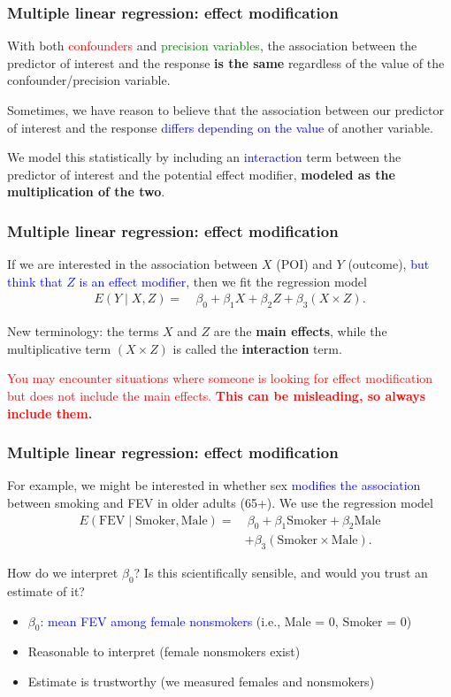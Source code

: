 \documentclass[12pt, 
hyperref={colorlinks=true, linkcolor=blue, urlcolor=cyan}]{beamer}
\begin{document}
\begin{frame}
\frametitle{Multiple linear regression: effect modification}

With both \textcolor{red}{confounders} and \textcolor{green}{precision variables}, the association between the predictor of interest and the response \textbf{is the same} regardless of the value of the confounder/precision variable.

Sometimes, we have reason to believe that the association between our predictor of interest and the response \textcolor{blue}{differs depending on the value} of another variable.

We model this statistically by including an \textcolor{blue}{interaction} term between the predictor of interest and the potential effect modifier, \textbf{modeled as the multiplication of the two}.
\end{frame}

\begin{frame}
\frametitle{Multiple linear regression: effect modification}

If we are interested in the association between $X$ (POI) and $Y$ (outcome), \textcolor{blue}{but think that $Z$ is an effect modifier}, then we fit the regression model
\begin{align*}
E(Y \mid X, Z) = & \ \beta_0 + \beta_1 X + \beta_2 Z + \beta_3 (X \times Z).
\end{align*}

New terminology: the terms $X$ and $Z$ are the \textbf{main effects}, while the multiplicative term $(X \times Z)$ is called the \textbf{interaction} term.

\textcolor{red}{You may encounter situations where someone is looking for effect modification but does not include the main effects. \textbf{This can be misleading, so always include them.}}
\end{frame}

\begin{frame}
\frametitle{Multiple linear regression: effect modification}
For example, we might be interested in whether sex \textcolor{blue}{modifies the association} between smoking and FEV in older adults (65+). We use the regression model
\begin{align*}
E(\text{FEV} \mid \text{Smoker}, \text{Male}) = & \ \beta_0 + \beta_1 \text{Smoker} + \beta_2 \text{Male}\\
& + \beta_3 (\text{Smoker} \times \text{Male}).
\end{align*}

How do we interpret $\beta_0$? Is this scientifically sensible, and would you trust an estimate of it?\vspace{-0.2cm} \pause
\begin{itemize}
\item $\beta_0$: \textcolor{blue}{mean FEV among female nonsmokers} (i.e., Male = 0, Smoker = 0)
\item Reasonable to interpret (female nonsmokers exist)
\item Estimate is trustworthy (we measured females and nonsmokers)
\end{itemize}
\end{frame}
\end{document}
